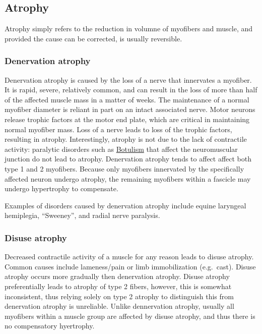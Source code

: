 \documentclass[openany]{report}
\begin{document}
\subsection{Atrophy}\label{atrophy}

Atrophy simply refers to the reduction in volumne of myofibers and
muscle, and provided the cause can be corrected, is usually reversible.

\subsubsection{Denervation atrophy}\label{denervation-atrophy}

Denervation atrophy is caused by the loss of a nerve that innervates a
myofiber. It is rapid, severe, relatively common, and can result in the
loss of more than half of the affected muscle mass in a matter of weeks.
The maintenance of a normal myofiber diameter is reliant in part on an
intact associated nerve. Motor neurons release trophic factors at the
motor end plate, which are critical in maintaining normal myofiber mass.
Loss of a nerve leads to loss of the trophic factors, resulting in
atrophy. Interestingly, atrophy is not due to the lack of contractile
activity: paralytic disorders such as
\protect\hyperlink{botulism}{Botulism} that affect the neuromuscular
junction do not lead to atrophy. Denervation atrophy tends to affect
affect both type 1 and 2 myofibers. Because only myofibers innervated by
the specifically affected neuron undergo atrophy, the remaining
myofibers within a fascicle may undergo hypertrophy to compensate.

Examples of disorders caused by denervation atrophy include equine
laryngeal hemiplegia, ``Sweeney'', and radial nerve paralysis.

\subsubsection{Disuse atrophy}\label{disuse-atrophy}

Decreased contractile activity of a muscle for any reason leads to
disuse atrophy. Common causes include lameness/pain or limb
immobilization (e.g.~cast). Disuse atrophy occurs more gradually then
denervation atrophy. Disuse atrophy preferentially leads to atrophy of
type 2 fibers, however, this is somewhat inconsistent, thus relying
solely on type 2 atrophy to distinguish this from denervation atrophy is
unreliable. Unlike dennervation atrophy, usually all myofibers within a
muscle group are affected by disuse atrophy, and thus there is no
compensatory hyertrophy.
\end{document}
